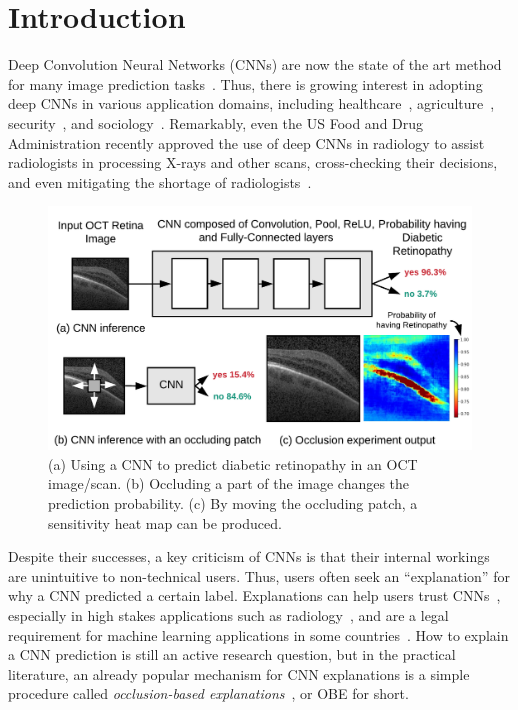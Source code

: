 \section{Introduction}
Deep Convolution Neural Networks (CNNs) are now the state of the art method for many image prediction tasks~\cite{imagenet}. Thus, there is growing interest in adopting deep CNNs in various application domains, including healthcare~\cite{kermany2018identifying, islam2017abnormality}, agriculture~\cite{mohanty2016using}, security~\cite{arbabzadah2016identifying}, and sociology~\cite{wang2017deep}. Remarkably, even the US Food and Drug Administration recently approved the use of deep CNNs in radiology to assist radiologists in processing X-rays and other scans, cross-checking their decisions, and even mitigating the shortage of radiologists~\cite{fdaretinopathy,radiologistshortage}.

\begin{figure}[t]
\includegraphics[width=\columnwidth]{./images/krypton_overview}
\caption{(a) Using a CNN to predict diabetic retinopathy in an OCT image/scan. (b) Occluding a part of the image changes the prediction probability. (c) By moving the occluding patch, a sensitivity heat map can be produced.}
\label{fig:krypton_overview}
\vspace{-4mm}
\end{figure}

Despite their successes, a key criticism of CNNs is that their internal workings are unintuitive to non-technical users. Thus, users often seek an ``explanation'' for why a CNN predicted a certain label. Explanations can help users trust CNNs~\cite{ribeiro2016should}, especially in high stakes applications such as radiology~\cite{jung2017deep}, and are a legal requirement for machine learning applications in some countries~\cite{gdpr}. How to explain a CNN prediction is still an active research question, but in the practical literature, an already popular mechanism for CNN explanations is a simple procedure called \textit{occlusion-based explanations}~\cite{zeiler2014visualizing}, or OBE for short.

